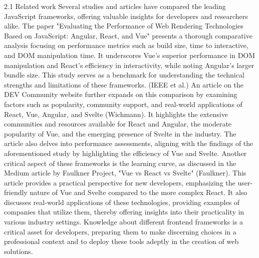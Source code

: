 2.1 Related work
Several studies and articles have compared the leading JavaScript frameworks, offering valuable insights for developers and researchers alike. The paper "Evaluating the Performance of Web Rendering Technologies Based on JavaScript: Angular, React, and Vue" presents a thorough comparative analysis focusing on performance metrics such as build size, time to interactive, and DOM manipulation time. It underscores Vue's superior performance in DOM manipulation and React's efficiency in interactivity, while noting Angular's larger bundle size. This study serves as a benchmark for understanding the technical strengths and limitations of these frameworks. (IEEE et al.)
An article on the DEV Community website further expands on this comparison by examining factors such as popularity, community support, and real-world applications of React, Vue, Angular, and Svelte​​ (Wichmann). It highlights the extensive communities and resources available for React and Angular, the moderate popularity of Vue, and the emerging presence of Svelte in the industry. The article also delves into performance assessments, aligning with the findings of the aforementioned study by highlighting the efficiency of Vue and Svelte​​​​.
Another critical aspect of these frameworks is the learning curve, as discussed in the Medium article by Faulkner Project, "Vue vs React vs Svelte" (Faulkner)​​. This article provides a practical perspective for new developers, emphasizing the user-friendly nature of Vue and Svelte compared to the more complex React. It also discusses real-world applications of these technologies, providing examples of companies that utilize them, thereby offering insights into their practicality in various industry settings​​​​​​.
Knowledge about different frontend frameworks is a critical asset for developers, preparing them to make discerning choices in a professional context and to deploy these tools adeptly in the creation of web solutions.
